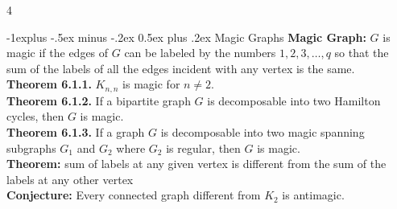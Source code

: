 \documentclass[letterpaper, 8pt]{extarticle}
\makeatletter
\renewcommand{\section}{\@startsection{section}{1}{0mm}%
	{-1explus -.5ex minus -.2ex}%
	{0.5ex plus .2ex}%
	{\normalfont\normalsize\bfseries}}
\makeatother
\begin{document}
\begin{multicols*}{4}


	\section{Magic Graphs}
	\textbf{Magic Graph:} $G$ is magic if the edges of $G$ can be labeled by the numbers $1,2,3,\dots, q$ so that the sum of the labels of all the edges incident with any vertex is the same. \\

	\textbf{Theorem 6.1.1.} $K_{n,n}$ is magic for $n \ne 2$. \\
	\textbf{Theorem 6.1.2.} If a bipartite graph $G$ is decomposable into two Hamilton cycles, then $G$ is magic. \\
	\textbf{Theorem 6.1.3.} If a graph $G$ is decomposable into two magic spanning subgraphs $G_1$ and $G_2$ where $G_2$ is regular, then $G$ is magic. \\
	\textbf{Theorem:} sum of labels at any given vertex is different from the sum of the labels at any other vertex \\
	\textbf{Conjecture:} Every connected graph different from $K_2$ is antimagic.


\end{multicols*}
\end{document}
